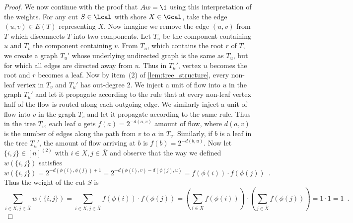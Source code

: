 \begin{proof}
We now continue with the proof that $Aw = \1$ using this interpretation of the weights.  For any cut $S\in \Lcal$ with shore $X \in \Gcal$, take the edge $(u,v) \in E(T)$ representing $X$.
Now imagine we remove the edge $(u,v)$ from $T$ which disconnects $T$ into two components.  Let $T_u$ be the component containing $u$ and $T_v$ the component containing $v$.
From $T_u$, which contains the root $r$ of $T$, we create a graph $T_u'$ whose underlying undirected graph is the same as $T_u$, but for which all edges are directed away from $u$.  Thus in
$T_u'$, vertex $u$ becomes the root and $r$ becomes a leaf.  Now by item~(2) of \cref{lem:tree_structure}, every non-leaf vertex in $T_v$ and $T_u'$ has out-degree $2$.  We inject a unit of flow into $u$ in the graph $T_u'$
and let it propagate according to the rule that at every non-leaf vertex half of the flow is routed along each outgoing edge.  We similarly inject a unit of flow into $v$ in the graph $T_v$ and let it
propagate according to the same rule.  Thus in the tree $T_v$, each leaf $a$ gets $f(a) = 2^{-d(a,v)}$ amount of flow, where $d(a,v)$ is the number of edges along the path from $v$ to $a$ in $T_v$.
Similarly, if $b$ is a leaf in the tree $T_u'$, the amount of flow arriving at $b$ is $f(b) = 2^{-d(b,u)}$. Now let $\{i,j\} \in [n]^{(2)}$ with $i \in X, j \in \bar{X}$ and observe that the way we defined $w(\{i,j\})$ satisfies
 \[
 w(\{i,j\}) = 2^{-d(\phi(i),\phi(j))+1}  = 2^{-d(\phi(i),v) - d(\phi(j),u)} = f(\phi(i))\cdot  f(\phi(j)) \enspace.
 \]
 Thus the weight of the cut $S$ is
 \[
 \sum_{i\in X,j\in \bar{X}} w(\{i,j\}) =  \sum_{i\in X,j\in \bar{X}} f(\phi(i)) \cdot f(\phi(j)) =  \left(\sum_{i\in X} f(\phi(i))\right) \cdot \left(\sum_{j\in \bar{X}} f(\phi(j))\right) = 1\cdot 1 = 1 \enspace .
 \]

\end{proof}

